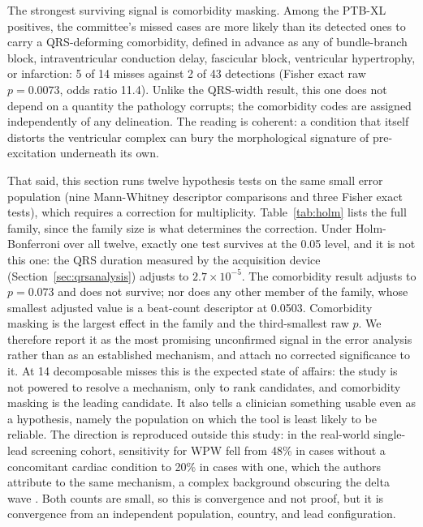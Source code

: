 \documentclass[11pt]{article}
\begin{document}
The strongest surviving signal is comorbidity masking. Among the PTB-XL positives, the committee's missed cases are more likely than its detected ones to carry a QRS-deforming comorbidity, defined in advance as any of bundle-branch block, intraventricular conduction delay, fascicular block, ventricular hypertrophy, or infarction: 5 of 14 misses against 2 of 43 detections (Fisher exact raw $p = 0.0073$, odds ratio 11.4). Unlike the QRS-width result, this one does not depend on a quantity the pathology corrupts; the comorbidity codes are assigned independently of any delineation. The reading is coherent: a condition that itself distorts the ventricular complex can bury the morphological signature of pre-excitation underneath its own.

That said, this section runs twelve hypothesis tests on the same small error population (nine Mann-Whitney descriptor comparisons and three Fisher exact tests), which requires a correction for multiplicity. Table~\ref{tab:holm} lists the full family, since the family size is what determines the correction. Under Holm-Bonferroni over all twelve, exactly one test survives at the 0.05 level, and it is not this one: the QRS duration measured by the acquisition device (Section~\ref{sec:qrsanalysis}) adjusts to $2.7\times10^{-5}$. The comorbidity result adjusts to $p = 0.073$ and does not survive; nor does any other member of the family, whose smallest adjusted value is a beat-count descriptor at 0.0503. Comorbidity masking is the largest effect in the family and the third-smallest raw $p$. We therefore report it as the most promising unconfirmed signal in the error analysis rather than as an established mechanism, and attach no corrected significance to it. At 14 decomposable misses this is the expected state of affairs: the study is not powered to resolve a mechanism, only to rank candidates, and comorbidity masking is the leading candidate. It also tells a clinician something usable even as a hypothesis, namely the population on which the tool is least likely to be reliable. The direction is reproduced outside this study: in the real-world single-lead screening cohort, sensitivity for WPW fell from 48\% in cases without a concomitant cardiac condition to 20\% in cases with one, which the authors attribute to the same mechanism, a complex background obscuring the delta wave \cite{huang}. Both counts are small, so this is convergence and not proof, but it is convergence from an independent population, country, and lead configuration.
\end{document}
